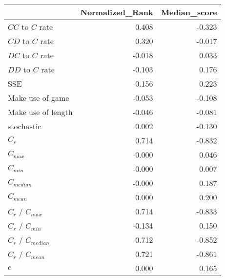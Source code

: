 \begin{tabular}{lrr}
\toprule
{} &  Normalized_Rank &  Median_score \\
\midrule
$CC$ to $C$ rate     &            0.408 &        -0.323 \\
$CD$ to $C$ rate     &            0.320 &        -0.017 \\
$DC$ to $C$ rate     &           -0.018 &         0.033 \\
$DD$ to $C$ rate     &           -0.103 &         0.176 \\
SSE                  &           -0.156 &         0.223 \\
Make use of game     &           -0.053 &        -0.108 \\
Make use of length   &           -0.046 &        -0.081 \\
stochastic           &            0.002 &        -0.130 \\
$C_r$                &            0.714 &        -0.832 \\
$C_{max}$            &           -0.000 &         0.046 \\
$C_{min}$            &           -0.000 &         0.007 \\
$C_{median}$         &           -0.000 &         0.187 \\
$C_{mean}$           &            0.000 &         0.200 \\
$C_r$ / $C_{max}$    &            0.714 &        -0.833 \\
$C_r$ / $C_{min}$    &           -0.134 &         0.150 \\
$C_r$ / $C_{median}$ &            0.712 &        -0.852 \\
$C_r$ / $C_{mean}$   &            0.721 &        -0.861 \\
$e$                  &            0.000 &         0.165 \\
\bottomrule
\end{tabular}

